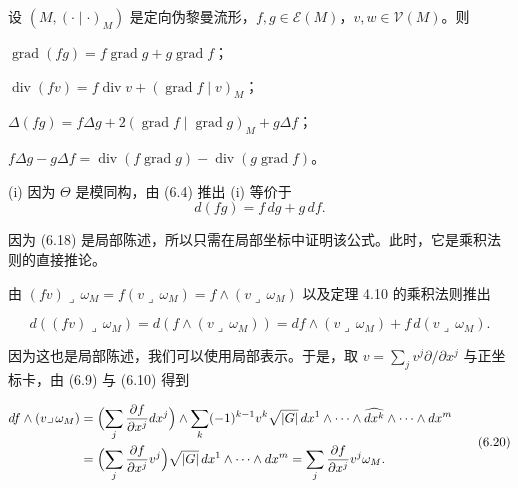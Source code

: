 \begin{proposition}

设 $ (M,(\cdot\mid\cdot)_M) $ 是定向伪黎曼流形，$ f, g \in \mathcal{E}(M) $，$ v, w \in \mathcal{V}(M) $。则

\begin{subitems}
\item

$ \operatorname{grad}(fg) = f\operatorname{grad} g + g\operatorname{grad} f $；

\item

$ \operatorname{div}(fv) = f\operatorname{div} v + (\operatorname{grad} f\mid v)_M $；

\item

$ \Delta(fg) = f\Delta g + 2(\operatorname{grad} f\mid\operatorname{grad} g)_M + g\Delta f $；

\item

$ f\Delta g - g\Delta f = \operatorname{div}(f\operatorname{grad} g) - \operatorname{div}(g\operatorname{grad} f) $。

\proofhead
(i) 因为 $ \Theta $ 是模同构，由 (6.4) 推出 (i) 等价于
\begin{equation}
d(fg) = f\,dg + g\,df.\tag{6.18}
\end{equation}

因为 (6.18) 是局部陈述，所以只需在局部坐标中证明该公式。此时，它是乘积法则的直接推论。

\end{subitems}

\begin{subitems}
\item[（ii）]

由 $ (fv)\lrcorner\,\omega_M = f(v\lrcorner\,\omega_M) = f\wedge(v\lrcorner\,\omega_M) $ 以及定理 4.10 的乘积法则推出

\begin{equation}
d((fv)\lrcorner\,\omega_{M}) = d(f\wedge(v\lrcorner\,\omega_{M})) = df\wedge(v\lrcorner\,\omega_{M}) + f\,d(v\lrcorner\,\omega_{M}).\tag{6.19}
\end{equation}

因为这也是局部陈述，我们可以使用局部表示。于是，取 $ v = \sum_j v^j\partial/\partial x^j $ 与正坐标卡，由 (6.9) 与 (6.10) 得到

\begin{equation}
\begin{aligned}
df\wedge(v\lrcorner\,\omega_{M}) &= \Bigl(\sum_{j}\frac{\partial f}{\partial x^{j}}dx^{j}\Bigr)\wedge\sum_{k}(-1)^{k-1}v^{k}\sqrt{|G|}\,dx^{1}\wedge\cdots\wedge\widehat{dx^{k}}\wedge\cdots\wedge dx^{m} \\ &= \Bigl(\sum_{j}\frac{\partial f}{\partial x^{j}}v^{j}\Bigr)\sqrt{|G|}\,dx^{1}\wedge\cdots\wedge dx^{m} = \sum_{j}\frac{\partial f}{\partial x^{j}}v^{j}\omega_{M}.
\end{aligned}\tag{6.20}
\end{equation}


\end{subitems}
\end{proposition}
